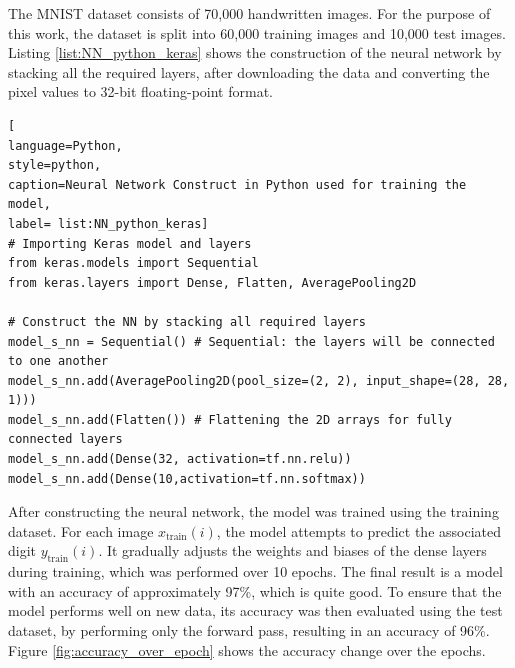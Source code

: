 \documentclass[11pt]{report}
\begin{document}
The MNIST dataset consists of 70,000 handwritten images. For the purpose of this work, the dataset is split into 60,000 training images and 10,000 test images. Listing \ref{list:NN_python_keras} shows the construction of the neural network by stacking all the required layers, after downloading the data and converting the pixel values to 32-bit floating-point format.

\begin{lstlisting}[
language=Python,
style=python,
caption=Neural Network Construct in Python used for training the model,
label= list:NN_python_keras]
# Importing Keras model and layers
from keras.models import Sequential
from keras.layers import Dense, Flatten, AveragePooling2D

# Construct the NN by stacking all required layers
model_s_nn = Sequential() # Sequential: the layers will be connected to one another
model_s_nn.add(AveragePooling2D(pool_size=(2, 2), input_shape=(28, 28, 1)))
model_s_nn.add(Flatten()) # Flattening the 2D arrays for fully connected layers
model_s_nn.add(Dense(32, activation=tf.nn.relu))
model_s_nn.add(Dense(10,activation=tf.nn.softmax))
\end{lstlisting}

After constructing the neural network, the model was trained using the training dataset. For each image \( x_{\text{train}}(i) \), the model attempts to predict the associated digit \( y_{\text{train}}(i) \). It gradually adjusts the weights and biases of the dense layers during training, which was performed over 10 epochs. The final result is a model with an accuracy of approximately 97\%, which is quite good. To ensure that the model performs well on new data, its accuracy was then evaluated using the test dataset, by performing only the forward pass, resulting in an accuracy of 96\%. Figure \ref{fig:accuracy_over_epoch} shows the accuracy change over the epochs.
\end{document}
